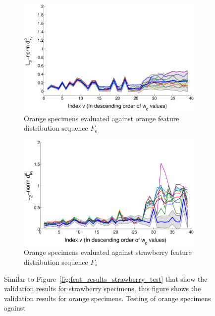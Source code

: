 \documentclass {udthesis}
\begin{document}
\begin{figure}
  \vskip -12pt
  \centering
  \begin{subfigure}[]{0.6\textwidth}
      \includegraphics[width=\textwidth]{validation_orange_testset_orange_learnset}
      \caption{Orange specimens evaluated against orange feature distribution sequence $F_o$}
      \label{fig:feat_results_orange_test_orange_learn}
  \end{subfigure}
  \begin{subfigure}[]{0.6\textwidth}
      \includegraphics[width=\textwidth]{validation_orange_testset_strawberry_learnset}
      \caption{Orange specimens evaluated against strawberry feature distribution sequence $F_s$}
      \label{fig:feat_results_orange_test_strawberry_learn}
  \end{subfigure}
\caption[Orange specimen validation results]{Similar to Figure~\ref{fig:feat_results_strawberry_test} that show the validation results for strawberry specimens, this figure shows the validation results for orange specimens. Testing of orange specimens against 
}
\end{figure}
\end{document}
